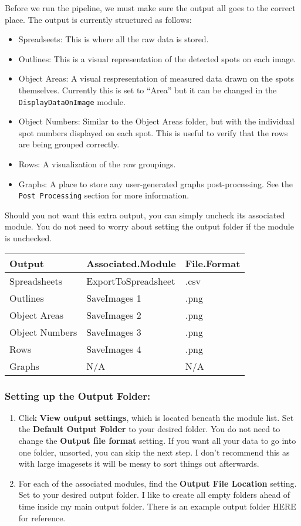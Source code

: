 \documentclass[
]{article}
\begin{document}
Before we run the pipeline, we must make sure the output all goes to the
correct place. The output is currently structured as follows:

\begin{itemize}
\item
  Spreadseets: This is where all the raw data is stored.
\item
  Outlines: This is a visual representation of the detected spots on
  each image.
\item
  Object Areas: A visual respresentation of measured data drawn on the
  spots themselves. Currently this is set to ``Area'' but it can be
  changed in the \texttt{DisplayDataOnImage} module.
\item
  Object Numbers: Similar to the Object Areas folder, but with the
  individual spot numbers displayed on each spot. This is useful to
  verify that the rows are being grouped correctly.
\item
  Rows: A visualization of the row groupings.
\item
  Graphs: A place to store any user-generated graphs post-processing.
  See the \texttt{Post\ Processing} section for more information.
\end{itemize}

Should you not want this extra output, you can simply uncheck its
associated module. You do not need to worry about setting the output
folder if the module is unchecked.

\begin{longtable}[]{@{}lll@{}}
\toprule
Output & Associated.Module & File.Format\tabularnewline
\midrule
\endhead
Spreadsheets & ExportToSpreadsheet & .csv\tabularnewline
Outlines & SaveImages 1 & .png\tabularnewline
Object Areas & SaveImages 2 & .png\tabularnewline
Object Numbers & SaveImages 3 & .png\tabularnewline
Rows & SaveImages 4 & .png\tabularnewline
Graphs & N/A & N/A\tabularnewline
\bottomrule
\end{longtable}

\hypertarget{setting-up-the-output-folder}{%
\subsubsection{Setting up the Output
Folder:}\label{setting-up-the-output-folder}}

\begin{enumerate}
\def\labelenumi{\arabic{enumi}.}
\item
  Click \textbf{View output settings}, which is located beneath the
  module list. Set the \textbf{Default Output Folder} to your desired
  folder. You do not need to change the \textbf{Output file format}
  setting. If you want all your data to go into one folder, unsorted,
  you can skip the next step. I don't recommend this as with large
  imagesets it will be messy to sort things out afterwards.
\item
  For each of the associated modules, find the \textbf{Output File
  Location} setting. Set to your desired output folder. I like to create
  all empty folders ahead of time inside my main output folder. There is
  an example output folder HERE for reference.
\end{enumerate}
\end{document}
